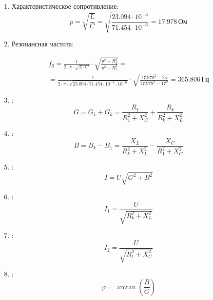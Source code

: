 \begin{enumerate}
	\item Характеристическое сопротивление:
	      \[
		      p = \sqrt{\frac{L}{C}} = \sqrt{\frac{23.094 \cdot 10^{-3}}{71.454 \cdot 10^{-6}}} = 17.978 \, \text{Ом}
	      \]
	\item Резонансная частота:

	      \[
		      \begin{gathered}
			      f_0 = \frac{1}{2 \cdot \pi \cdot \sqrt{L \cdot C}} \cdot \sqrt{\frac{p^2 - R_k^2}{p^2-R_1^2}} = \\
			      = \frac{1}{2 \cdot \pi \cdot \sqrt{23.094 \cdot 71.454 \cdot 10^{-3} \cdot 10^{-6}}} \cdot \sqrt{\frac{17.978^2 - 25}{17.978^2 - 17^2}} = 365.806 \, \text{Гц}
		      \end{gathered}
	      \]

	\item {}:
	      \[
		      G = G_1 + G_k = \frac{R_1}{R_1^2 + X_C^2} + \frac{R_k}{R_k^2 + X_L^2}
	      \]

	\item {}:
	      \[
		      B = B_k - B_1 = \frac{X_L}{R_k^2 + X_L^2} - \frac{X_C}{R_1^2 + X_C^2}
	      \]

	\item {}:
	      \[
		      I = U \sqrt{G^2 + B^2}
	      \]

	\item {}:
	      \[
		      I_1 = \frac{U}{\sqrt{R_k^2 + X_L^2}}
	      \]

	\item {}:
	      \[
		      I_2 = \frac{U}{\sqrt{R_1^2 + X_C^2}}
	      \]

	\item {}:
	      \[
		      \varphi = \arctan\left(\frac{B}{G}\right)
	      \]

\end{enumerate}
